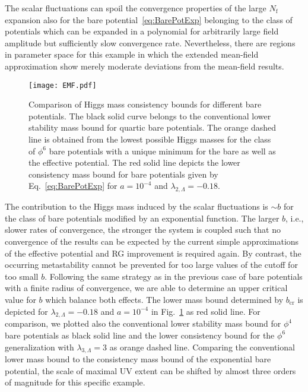 \documentclass[twocolumn,aps,prd,showpacs,nofootinbib,superscriptaddress,preprintnumbers,floatfix,10pt]{revtex4-1}
\newcommand{\Nf}{N_{\mathrm{f}}}
\newcommand{\lL}{\lambda_{2,\Lambda}}
\begin{document}
The scalar fluctuations can spoil the convergence properties of the large $\Nf$ expansion also for the bare potential~\eqref{eq:BarePotExp} belonging to the class of potentials which can be expanded in a polynomial for arbitrarily large field amplitude but sufficiently slow convergence rate. Nevertheless, there are regions in parameter space for this example in which the extended mean-field approximation show merely moderate deviations from the mean-field results. 



\begin{figure}[t!]
\centering
\texttt{[image: EMF.pdf]}
\caption{Comparison of Higgs mass consistency bounds for different bare potentials. The black solid curve belongs to the conventional lower stability mass bound for quartic bare potentials. The orange dashed line is obtained from the lowest possible Higgs masses for the class of $\phi^{6}$ bare potentials with a unique minimum for the bare as well as the effective potential. The red solid line depicts the lower consistency mass bound for bare potentials given by Eq.~\eqref{eq:BarePotExp} for $a=10^{-4}$ and ${\lL=-0.18}$.}
\label{fig:HiggsMass}
\end{figure}


The contribution to the Higgs mass induced by the scalar fluctuations is ${\sim} b$ for the class of bare potentials modified by an exponential function.
The larger $b$, i.e., slower rates of convergence, the stronger the system is coupled such that no convergence of the results can be expected by the current simple approximations of the effective potential and RG improvement is required again. 
By contrast, the occurring metastability cannot be prevented for too large values of the cutoff for too small $b$. 
Following the same strategy as in the previous case of bare potentials with a finite radius of convergence, we are able to determine an upper critical value for $b$ which balance both effects. 
The lower mass bound determined by $b_{\mathrm{cr}}$ is depicted for $\lL=-0.18$ and $a=10^{-4}$ in Fig.~\ref{fig:HiggsMass} as red solid line. For comparison, we plotted also the conventional lower stability mass bound for $\phi^{4}$ bare potentials as black solid line and the lower consistency bound for the $\phi^{6}$ generalization with $\lambda_{3,\Lambda}=3$ as orange dashed line. 
Comparing the conventional lower mass bound to the consistency mass bound of the exponential bare potential, the scale of maximal UV extent can be shifted by almost three orders of magnitude for this specific example.
\end{document}
